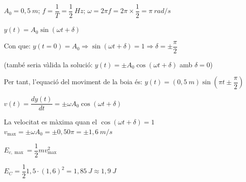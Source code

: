 \begin{solapartat}
 $A_0 = 0,5\ m$; $f = \dfrac{1}{T} = \dfrac{1}{2}\ Hz$; $\omega = 2\pi f = 2\pi\times\dfrac{1}{2} = \pi\ rad/s$

 $y(t) = A_0\sin(\omega t + \delta)$

Con que: $y(t = 0) = A_0 \Rightarrow \sin(\omega t + \delta) = 1 \Rightarrow \delta = \pm\dfrac{\pi}{2}$

(també seria vàlida la solució: $y(t) = \pm A_0\cos(\omega t + \delta)$ amb $\delta = 0$)

 Per tant, l'equació del moviment de la boia és: $y(t) = (0,5\ m)\sin\left(\pi t \pm \dfrac{\pi}{2}\right)$
\end{solapartat}

\begin{solapartat}
 $v(t) = \dfrac{dy(t)}{dt} = \pm\omega A_0\cos(\omega t + \delta)$

 La velocitat es màxima quan el $\cos(\omega t + \delta) = 1$\\
$v_{\max} = \pm\omega A_0 = \pm 0,50\pi = \pm 1,6\ m/s$

 $E_{c,\max} = \dfrac{1}{2}mv^2_{\max}$

 $E_C = \dfrac{1}{2}1,5\cdot(1,6)^2 = 1,85\ J \approx 1,9\ J$
\end{solapartat}
